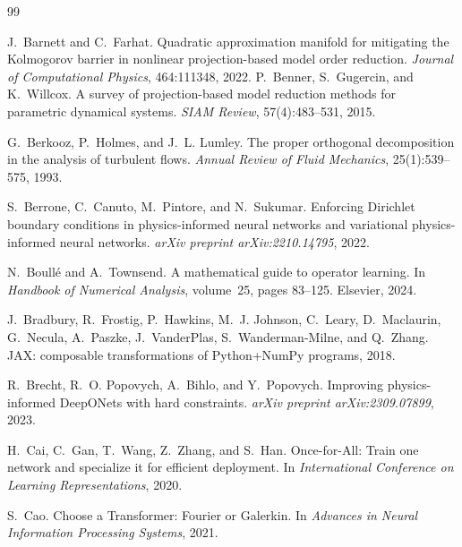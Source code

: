 \begin{thebibliography}{99}

J.~Barnett and C.~Farhat.
\newblock Quadratic approximation manifold for mitigating the
Kolmogorov barrier in nonlinear projection-based model order reduction.
\newblock \emph{Journal of Computational Physics}, 464:111348, 2022.
P.~Benner, S.~Gugercin, and K.~Willcox.
\newblock A survey of projection-based model reduction methods for
parametric dynamical systems.
\newblock \emph{SIAM Review}, 57(4):483--531, 2015.

G.~Berkooz, P.~Holmes, and J.~L. Lumley.
\newblock The proper orthogonal decomposition in the analysis of
turbulent flows.
\newblock \emph{Annual Review of Fluid Mechanics}, 25(1):539--575, 1993.

S.~Berrone, C.~Canuto, M.~Pintore, and N.~Sukumar.
\newblock Enforcing Dirichlet boundary conditions in physics-informed
neural networks and variational physics-informed neural networks.
\newblock \emph{arXiv preprint arXiv:2210.14795}, 2022.

N.~Boull\'e and A.~Townsend.
\newblock A mathematical guide to operator learning.
\newblock In \emph{Handbook of Numerical Analysis}, volume~25, pages
83--125. Elsevier, 2024.

J.~Bradbury, R.~Frostig, P.~Hawkins, M.~J. Johnson, C.~Leary,
D.~Maclaurin, G.~Necula, A.~Paszke, J.~VanderPlas, S.~Wanderman-Milne,
and Q.~Zhang.
\newblock JAX: composable transformations of Python+NumPy programs, 2018.

R.~Brecht, R.~O. Popovych, A.~Bihlo, and Y.~Popovych.
\newblock Improving physics-informed DeepONets with hard constraints.
\newblock \emph{arXiv preprint arXiv:2309.07899}, 2023.

H.~Cai, C.~Gan, T.~Wang, Z.~Zhang, and S.~Han.
\newblock Once-for-All: Train one network and specialize it for
efficient deployment.
\newblock In \emph{International Conference on Learning Representations},
2020.

S.~Cao.
\newblock Choose a Transformer: Fourier or Galerkin.
\newblock In \emph{Advances in Neural Information Processing Systems},
2021.


\end{thebibliography}
